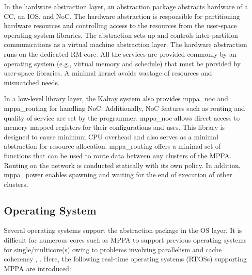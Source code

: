In the hardware abstraction layer, an abstraction package abstracts hardware of a CC, an IOS, and NoC.
The hardware abstraction is responsible for partitioning hardware resources and controlling access to the resources from the user-space operating system libraries.
The abstraction sets-up and controls inter-partition communications as a virtual machine abstraction layer.
The hardware abstraction runs on the dedicated RM core.
All the services are provided commonly by an operating system (e.g., virtual memory and schedule) that must be provided by user-space libraries.
A minimal kernel avoids wastage of resources and mismatched needs.

In a low-level library layer, the Kalray system also provides mppa\_noc and mppa\_routing for handling NoC.
Additionally, NoC features such as routing and quality of service are set by the programmer.
mppa\_noc allows direct access to memory mapped registers for their configurations and uses.
This library is designed to cause minimum CPU overhead and also serves as a minimal abstraction for resource allocation.
mppa\_routing offers a minimal set of functions that can be used to route data between any clusters of the MPPA.
Routing on the network is conducted statically with its own policy.
In addition, mppa\_power enables spawning and waiting for the end of execution of other clusters.


\subsection{Operating System}
\label{sec:operating_system}
Several operating systems support the abstraction package in the OS layer.
It is difficult for numerous cores such as MPPA to support previous operating systems for single/multicore(s) owing to problems involving parallelism and cache coherency \cite{Wentzlaff2009FOS}, \cite{schupbach2008embracing}.
Here, the following real-time operating systems (RTOSs) supporting MPPA are introduced:


